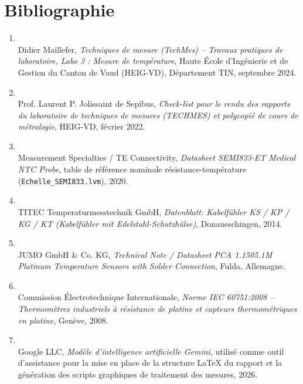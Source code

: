 \chapter{Bibliographie}
\label{sec:bibliographie}

\vspace{-6pt}
\begin{enumerate}[leftmargin=1.1cm,label=\arabic*),topsep=1pt,itemsep=1pt,parsep=0pt]
    \item {} \\
    Didier Maillefer, \textit{Techniques de mesure (TechMes) -- Travaux pratiques de laboratoire, Labo 3 : Mesure de température}, Haute École d'Ingénierie et de Gestion du Canton de Vaud (HEIG-VD), Département TIN, septembre 2024.

    \item {} \\
    Prof. Laurent P. Jolissaint de Sepibus, \textit{Check-list pour le rendu des rapports du laboratoire de techniques de mesures (TECHMES) et polycopié de cours de métrologie}, HEIG-VD, février 2022.

    \item {} \\
    Measurement Specialties / TE Connectivity, \textit{Datasheet SEMI833-ET Medical NTC Probe}, table de référence nominale résistance-température (\texttt{Echelle\_SEMI833.lvm}), 2020.

    \item {} \\
    TITEC Temperaturmesstechnik GmbH, \textit{Datenblatt: Kabelfühler KS / KP / KG / KT (Kabelfühler mit Edelstahl-Schutzhülse)}, Donaueschingen, 2014.

    \item {} \\
    JUMO GmbH \& Co. KG, \textit{Technical Note / Datasheet PCA 1.1505.1M Platinum Temperature Sensors with Solder Connection}, Fulda, Allemagne.

    \item {} \\
    Commission Électrotechnique Internationale, \textit{Norme IEC 60751:2008 -- Thermomètres industriels à résistance de platine et capteurs thermométriques en platine}, Genève, 2008.

    \item {} \\
    Google LLC, \textit{Modèle d'intelligence artificielle Gemini}, utilisé comme outil d'assistance pour la mise en place de la structure \LaTeX{} du rapport et la génération des scripts graphiques de traitement des mesures, 2026.
\end{enumerate}
